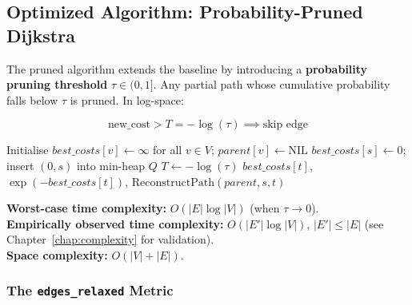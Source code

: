 \subsection{Optimized Algorithm: Probability-Pruned Dijkstra}

The pruned algorithm extends the baseline by introducing a \textbf{probability pruning threshold} $\tau \in (0, 1]$. Any partial path whose cumulative probability falls below $\tau$ is pruned. In log-space:

\[
\text{new\_cost} > T = -\log(\tau) \implies \text{skip edge}
\]

\begin{algorithm}[H]
\caption{Probability-Pruned Dijkstra}\label{alg:pruned}
\SetAlgoLined
\KwIn{Graph $G=(V,E)$, source $s$, target $t$, pruning threshold $\tau \in (0,1]$}
Initialise $\mathit{best\_costs}[v] \leftarrow \infty$ for all $v \in V$; $\mathit{parent}[v] \leftarrow \mathrm{NIL}$\;
$\mathit{best\_costs}[s] \leftarrow 0$; insert $(0, s)$ into min-heap $Q$\;
$T \leftarrow -\log(\tau)$
\Return $\mathit{best\_costs}[t]$, $\exp(-\mathit{best\_costs}[t])$, $\mathrm{ReconstructPath}(\mathit{parent}, s, t)$\;
\end{algorithm}

\noindent\textbf{Worst-case time complexity:} $O(|E| \log |V|)$ (when $\tau \to 0$).\\
\textbf{Empirically observed time complexity:} $O(|E'| \log |V|)$, $|E'| \leq |E|$ (see Chapter~\ref{chap:complexity} for validation).\\
\textbf{Space complexity:} $O(|V| + |E|)$.

\subsubsection{The \texttt{edges\_relaxed} Metric}

